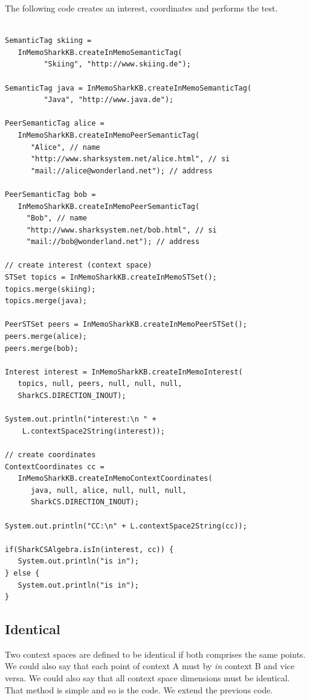 The following code creates an interest, coordinates and performs the test.

\begin{verbatim}

SemanticTag skiing = 
   InMemoSharkKB.createInMemoSemanticTag(
         "Skiing", "http://www.skiing.de");

SemanticTag java = InMemoSharkKB.createInMemoSemanticTag(
         "Java", "http://www.java.de");

PeerSemanticTag alice = 
   InMemoSharkKB.createInMemoPeerSemanticTag(
      "Alice", // name
      "http://www.sharksystem.net/alice.html", // si
      "mail://alice@wonderland.net"); // address

PeerSemanticTag bob = 
   InMemoSharkKB.createInMemoPeerSemanticTag(
     "Bob", // name
     "http://www.sharksystem.net/bob.html", // si
     "mail://bob@wonderland.net"); // address

// create interest (context space)
STSet topics = InMemoSharkKB.createInMemoSTSet();
topics.merge(skiing);
topics.merge(java);

PeerSTSet peers = InMemoSharkKB.createInMemoPeerSTSet();
peers.merge(alice);
peers.merge(bob);

Interest interest = InMemoSharkKB.createInMemoInterest(
   topics, null, peers, null, null, null, 
   SharkCS.DIRECTION_INOUT);

System.out.println("interest:\n " + 
    L.contextSpace2String(interest));

// create coordinates
ContextCoordinates cc = 
   InMemoSharkKB.createInMemoContextCoordinates(
      java, null, alice, null, null, null, 
      SharkCS.DIRECTION_INOUT);

System.out.println("CC:\n" + L.contextSpace2String(cc));

if(SharkCSAlgebra.isIn(interest, cc)) {
   System.out.println("is in");
} else {
   System.out.println("is in");
}
\end{verbatim}

\subsection{Identical}
Two context spaces are defined to be identical if both comprises the same points. 
We could also say that each point of context A must by {\it in} context B and vice versa. We could also say that all context space dimensions must be identical. That method is simple and so is the code. We extend the previous code.

